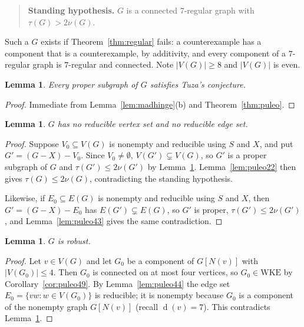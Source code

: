\documentclass[11pt,a4paper]{amsart}
\theoremstyle{plain}
\newtheorem{lemma}[theorem]{Lemma}
\theoremstyle{definition}
\newcommand{\WKE}{\mathrm{WKE}}
\newcommand{\N}{N}
\newcommand{\dg}{\operatorname{d}}
\begin{document}
\begin{quote}
\textbf{Standing hypothesis.} $G$ is a connected $7$-regular graph with
$\tau(G)>2\nu(G)$.
\end{quote}

Such a $G$ exists if Theorem~\ref{thm:regular} fails: a counterexample has a
component that is a counterexample, by additivity, and every component of a
$7$-regular graph is $7$-regular and connected. Note $|V(G)|\ge 8$ and
$|V(G)|$ is even.

\begin{lemma}\label{lem:proper}
Every proper subgraph of $G$ satisfies Tuza's conjecture.
\end{lemma}

\begin{proof}
Immediate from Lemma~\ref{lem:madhinge}(b) and Theorem~\ref{thm:puleo}.
\end{proof}

\begin{lemma}\label{lem:norreducible}
$G$ has no reducible vertex set and no reducible edge set.
\end{lemma}

\begin{proof}
Suppose $V_0\subseteq V(G)$ is nonempty and reducible using $S$ and $X$, and
put $G'=(G-X)-V_0$. Since $V_0\ne\emptyset$, $V(G')\subsetneq V(G)$, so $G'$
is a proper subgraph of $G$ and $\tau(G')\le 2\nu(G')$ by
Lemma~\ref{lem:proper}. Lemma~\ref{lem:puleo22} then gives
$\tau(G)\le 2\nu(G)$, contradicting the standing hypothesis.

Likewise, if $E_0\subseteq E(G)$ is nonempty and reducible using $S$ and $X$,
then $G'=(G-X)-E_0$ has $E(G')\subsetneq E(G)$, so $G'$ is proper,
$\tau(G')\le2\nu(G')$, and Lemma~\ref{lem:puleo43} gives the same
contradiction.
\end{proof}

\begin{lemma}\label{lem:robust}
$G$ is robust.
\end{lemma}

\begin{proof}
Let $v\in V(G)$ and let $G_0$ be a component of $G[\N(v)]$ with
$|V(G_0)|\le 4$. Then $G_0$ is connected on at most four vertices, so
$G_0\in\WKE$ by Corollary~\ref{cor:puleo49}. By Lemma~\ref{lem:puleo44} the
edge set $E_0=\{vw : w\in V(G_0)\}$ is reducible; it is nonempty because
$G_0$ is a component of the nonempty graph $G[\N(v)]$ (recall $\dg(v)=7$).
This contradicts Lemma~\ref{lem:norreducible}.
\end{proof}
\end{document}
